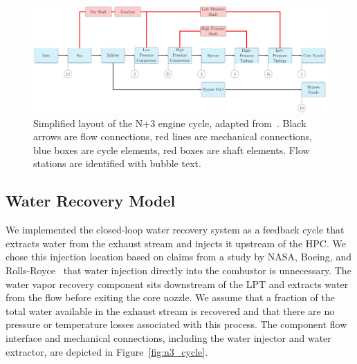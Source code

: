 \documentclass[conf]{new-aiaa}
\begin{document}
\begin{figure}[hbt!]
  \centering
  \includegraphics[width=1.0\textwidth]{N3_cycle.pdf}
  \caption{
    Simplified layout of the N+3 engine cycle, adapted from~\citet{Hendricks2019}.
    Black arrows are flow connections, red lines are mechanical connections, blue boxes are cycle elements, red boxes are shaft elements.
    Flow stations are identified with bubble text.
  }
  \label{fig:N3_original}
\end{figure}

\subsection{Water Recovery Model}
We implemented the closed-loop water recovery system as a feedback cycle that extracts water from the exhaust stream and injects it upstream of the HPC.
We chose this injection location based on claims from a study by NASA, Boeing, and Rolls-Royce~\cite{Daggett2010} that water injection directly into the combustor is unnecessary.
The water vapor recovery component sits downstream of the LPT and extracts water from the flow before exiting the core nozzle.
We assume that a fraction of the total water available in the exhaust stream is recovered and that there are no pressure or temperature losses associated with this process.
The component flow interface and mechanical connections, including the water injector and water extractor, are depicted in Figure~\ref{fig:n3_cycle}.
\end{document}

